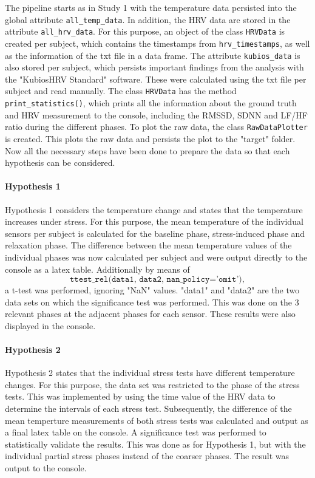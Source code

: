 The pipeline starts as in Study 1 with the temperature data persisted into the global attribute \texttt{all\_temp\_data}.
In addition, the HRV data are stored in the attribute \texttt{all\_hrv\_data}.
For this purpose, an object of the class \texttt{HRVData} is created per subject, which contains the timestamps from \texttt{hrv\_timestamps}, as well as the information of the txt file in a data frame.
The attribute \texttt{kubios\_data} is also stored per subject, which persists important findings from the analysis with the "KubiosHRV Standard" software.
These were calculated using the txt file per subject and read manually.
The class \texttt{HRVData} has the method \texttt{print\_statistics()}, which prints all the information about the ground truth and HRV measurement to the console, including the RMSSD, SDNN and LF/HF ratio during the different phases.
To plot the raw data, the class \texttt{RawDataPlotter} is created.
This plots the raw data and persists the plot to the "target" folder.
Now all the necessary steps have been done to prepare the data so that each hypothesis can be considered. 

\paragraph{Hypothesis 1}
Hypothesis 1 considers the temperature change and states that the temperature increases under stress.
For this purpose, the mean temperature of the individual sensors per subject is calculated for the baseline phase, stress-induced phase and relaxation phase. 
The difference between the mean temperature values of the individual phases was now calculated per subject and were output directly to the console as a latex table.
Additionally by means of 
\[
    \texttt{ttest\_rel(data1, data2, nan\_policy='omit')},
\]
a t-test was performed, ignoring "NaN" values. 
"data1" and "data2" are the two data sets on which the significance test was performed. 
This was done on the 3 relevant phases at the adjacent phases for each sensor. 
These results were also displayed in the console.

\paragraph{Hypothesis 2}
Hypothesis 2 states that the individual stress tests have different temperature changes.
For this purpose, the data set was restricted to the phase of the stress tests. 
This was implemented by using the time value of the HRV data to determine the intervals of each stress test.
Subsequently, the difference of the mean temperture measurements of both stress tests was calculated and output as a final latex table on the console.
A significance test was performed to statistically validate the results.
This was done as for Hypothesis 1, but with the individual partial stress phases instead of the coarser phases.
The result was output to the console.